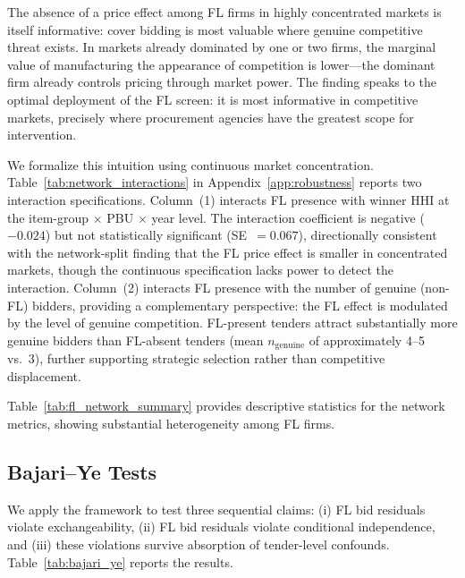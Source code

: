 The absence of a price effect among FL firms in highly concentrated
markets is itself informative: cover bidding is most valuable where
genuine competitive threat exists. In markets already dominated by one or
two firms, the marginal value of manufacturing the appearance of
competition is lower---the dominant firm already controls pricing through
market power. The finding speaks to the optimal deployment of the FL
screen: it is most informative in competitive markets, precisely where
procurement agencies have the greatest scope for intervention.

We formalize this intuition using continuous market concentration.
Table~\ref{tab:network_interactions} in Appendix~\ref{app:robustness}
reports two interaction specifications. Column~(1) interacts FL presence
with winner HHI at the item-group $\times$ PBU $\times$ year level. The
interaction coefficient is negative ($-0.024$) but not statistically
significant (SE~$= 0.067$), directionally consistent with the
network-split finding that the FL price effect is smaller in concentrated
markets, though the continuous specification lacks power to detect the
interaction. Column~(2)
interacts FL presence with the number of genuine (non-FL) bidders,
providing a complementary perspective: the FL effect is modulated by the
level of genuine competition. FL-present tenders attract substantially
more genuine bidders than FL-absent tenders (mean $n_{\text{genuine}}$
of approximately 4--5 vs.\ 3), further supporting strategic selection
rather than competitive displacement.



Table~\ref{tab:fl_network_summary} provides descriptive statistics for
the network metrics, showing substantial heterogeneity among FL firms.



\subsection{Bajari--Ye Tests}
\label{sec:results_bajari}

We apply the \citet{bajari2003deciding} framework to test three
sequential claims: (i) FL bid residuals violate exchangeability,
(ii) FL bid residuals violate conditional independence, and
(iii) these violations survive absorption of tender-level confounds.
Table~\ref{tab:bajari_ye} reports the results.



